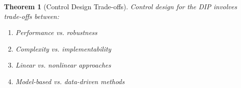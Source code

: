 \documentclass[11pt,a4paper]{article}
\newtheorem{theorem}{Theorem}[section]
\begin{document}
\begin{theorem}[Control Design Trade-offs]
Control design for the DIP involves trade-offs between:
\begin{enumerate}
    \item Performance vs. robustness
    \item Complexity vs. implementability
    \item Linear vs. nonlinear approaches
    \item Model-based vs. data-driven methods
\end{enumerate}
\end{theorem}

\end{document}
